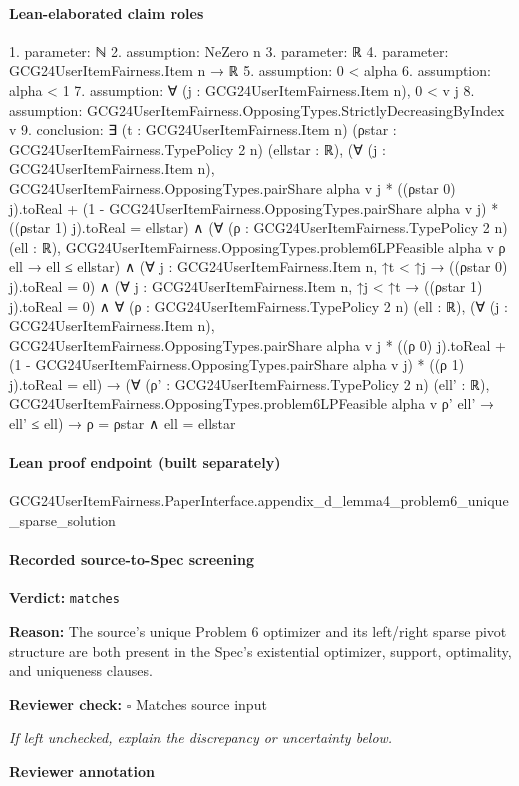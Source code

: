\documentclass[10pt]{article}
\newcommand{\reviewerbox}{%
  \par\noindent\fbox{\parbox{0.96\linewidth}{\rule{0pt}{0.38in}}}\par
}
\newcommand{\reviewmatch}[1]{%
  \par\noindent\textbf{Reviewer check:} $\square$\; #1\par
  \noindent\emph{If left unchecked, explain the discrepancy or uncertainty below.}\par
}
\begin{document}
\paragraph{Lean-elaborated claim roles}\begin{ReviewVerbatim}
1. parameter: ℕ
2. assumption: NeZero n
3. parameter: ℝ
4. parameter: GCG24UserItemFairness.Item n → ℝ
5. assumption: 0 < alpha
6. assumption: alpha < 1
7. assumption: ∀ (j : GCG24UserItemFairness.Item n), 0 < v j
8. assumption: GCG24UserItemFairness.OpposingTypes.StrictlyDecreasingByIndex v
9. conclusion: ∃ (t : GCG24UserItemFairness.Item n) (ρstar : GCG24UserItemFairness.TypePolicy 2 n) (ellstar : ℝ),
  (∀ (j : GCG24UserItemFairness.Item n),
      GCG24UserItemFairness.OpposingTypes.pairShare alpha v j * ((ρstar 0) j).toReal +
          (1 - GCG24UserItemFairness.OpposingTypes.pairShare alpha v j) * ((ρstar 1) j).toReal =
        ellstar) ∧
    (∀ (ρ : GCG24UserItemFairness.TypePolicy 2 n) (ell : ℝ),
        GCG24UserItemFairness.OpposingTypes.problem6LPFeasible alpha v ρ ell → ell ≤ ellstar) ∧
      (∀ {j : GCG24UserItemFairness.Item n}, ↑t < ↑j → ((ρstar 0) j).toReal = 0) ∧
        (∀ {j : GCG24UserItemFairness.Item n}, ↑j < ↑t → ((ρstar 1) j).toReal = 0) ∧
          ∀ (ρ : GCG24UserItemFairness.TypePolicy 2 n) (ell : ℝ),
            (∀ (j : GCG24UserItemFairness.Item n),
                GCG24UserItemFairness.OpposingTypes.pairShare alpha v j * ((ρ 0) j).toReal +
                    (1 - GCG24UserItemFairness.OpposingTypes.pairShare alpha v j) * ((ρ 1) j).toReal =
                  ell) →
              (∀ (ρ' : GCG24UserItemFairness.TypePolicy 2 n) (ell' : ℝ),
                  GCG24UserItemFairness.OpposingTypes.problem6LPFeasible alpha v ρ' ell' → ell' ≤ ell) →
                ρ = ρstar ∧ ell = ellstar
\end{ReviewVerbatim}

\paragraph{Lean proof endpoint (built separately)}\begin{ReviewVerbatim}
GCG24UserItemFairness.PaperInterface.appendix_d_lemma4_problem6_unique_sparse_solution
\end{ReviewVerbatim}

\paragraph{Recorded source-to-Spec screening}
\textbf{Verdict:} \texttt{matches}
\\
{\raggedright
\textbf{Reason:} The source's unique Problem 6 optimizer and its left/\allowbreak{}right sparse pivot structure are both present in the Spec's existential optimizer, support, optimality, and uniqueness clauses.\allowbreak{}
\par}
\reviewmatch{Matches source input}
\noindent\textbf{Reviewer annotation}\par
\reviewerbox
\clearpage
\hypertarget{source-claim-725d3169ac365914}{}
\end{document}
